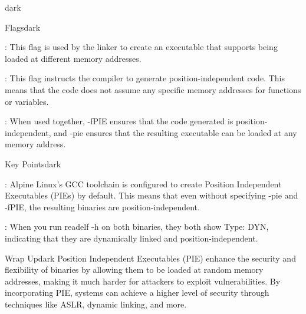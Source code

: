 \begin{baseBoxThree}{}{dark}
    \smallskip
    \begin{baseBoxThree}{Flags}{dark}
        \smallskip
        \begin{posnexItemize}
            \item[\sA] :  This flag is used by the linker to create an executable that supports being loaded at different memory addresses.
            \item[\sA] : This flag instructs the compiler to generate position-independent code. This means that the code does not assume any specific memory addresses for functions or variables.
            \item[\sA] : When used together, -fPIE ensures that the code generated is position-independent, and -pie ensures that the resulting executable can be loaded at any memory address.
        \end{posnexItemize}
        \smallskip
    \end{baseBoxThree}
    \smallskip
    \begin{baseBoxThree}{Key Points}{dark}
        \smallskip
        \begin{posnexItemize}
            \item[\sA] : Alpine Linux's GCC toolchain is configured to create Position Independent Executables (PIEs) by default. This means that even without specifying -pie and -fPIE, the resulting binaries are position-independent.
            \item[\sA] : When you run readelf -h on both binaries, they both show Type: DYN, indicating that they are dynamically linked and position-independent.
        \end{posnexItemize}
        \smallskip
    \end{baseBoxThree}
    \smallskip
    \begin{baseBoxThree}{Wrap Up}{dark}
        \smallskip
            Position Independent Executables (PIE) enhance the security and flexibility of binaries by allowing them to be loaded at random memory addresses, making it much harder for attackers to exploit vulnerabilities. By incorporating PIE, systems can achieve a higher level of security through techniques like ASLR, dynamic linking, and more.
        \smallskip
    \end{baseBoxThree}
    \smallskip
\end{baseBoxThree}
